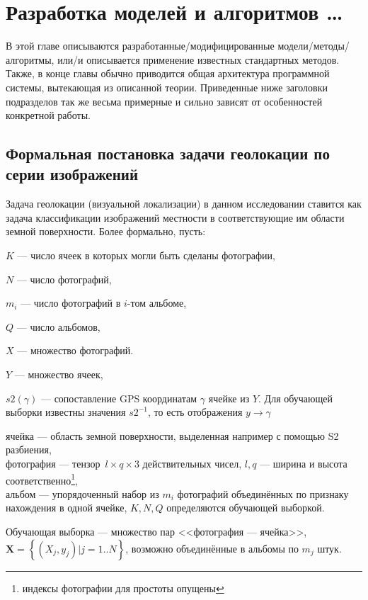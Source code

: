  \chapter{Разработка моделей и алгоритмов \dots}

В этой главе описываются разработанные/модифицированные модели/методы/
алгоритмы, или/и описывается применение известных стандартных методов. Также, 
в конце главы обычно приводится общая архитектура программной системы, 
вытекающая из описанной теории. Приведенные ниже заголовки подразделов так же 
весьма примерные и сильно зависят от особенностей конкретной работы.
\section{Формальная постановка задачи геолокации по серии изображений}

Задача геолокации (визуальной локализации) в данном исследовании ставится как задача классификации изображений местности в соответствующие им области земной поверхности. Более формально, пусть:

\begin{compactitem}
	\item $K$ --- число ячеек в которых могли быть сделаны фотографии,
	\item $N$ --- число фотографий,
	\item $m_i$ --- число фотографий в $i$-том альбоме,
	\item $ Q $ --- число альбомов,
	\item $X$ --- множество фотографий. 
	\item $ Y $ --- множество ячеек, 
	\item $ s2(\gamma) $ --- сопоставление GPS координатам $ \gamma $ ячейке из $ Y $. Для обучающей выборки известны значения $ s2^{-1} $, то есть отображения $ y \to \gamma $
\end{compactitem}
ячейка --- область земной поверхности, выделенная например с помощью S2 разбиения,\\
фотография --- тензор\, $ l \times q \times 3$  действительных чисел, $ l, q $ --- ширина 
и высота соответственно\footnote{индексы фотографии для простоты опущены},\\
альбом --- упорядоченный набор из $ m_i $ фотографий объединённых по признаку нахождения в одной ячейке, 
$ K, N, Q $ определяются обучающей выборкой.

Обучающая выборка --- множество пар <<фотография --- ячейка>>, $\mathbf{X} = \left\{(X_j, y_j)|j = 1 .. N \right\} $, возможно объединённые в альбомы по $ m_j $ штук.

